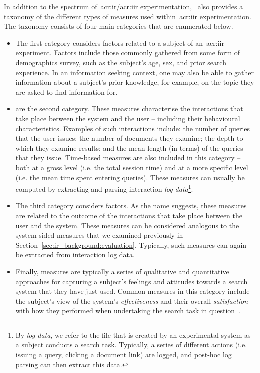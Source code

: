 In addition to the spectrum of~\gls{acr:ir}/\gls{acr:iir} experimentation,~\cite{kelly2009iir} also provides a taxonomy of the different types of measures used within~\gls{acr:iir} experimentation. The taxonomy consists of four main categories that are enumerated below.

\begin{itemize}
    
    \item{The first category considers  factors related to a subject of an~\gls{acr:iir} experiment. Factors include those commonly gathered from some form of demographics survey, such as the subject's age, sex, and prior search experience. In an information seeking context, one may also be able to gather information about a subject's prior knowledge, for example, on the topic they are asked to find information for.}
    
    \item{ are the second category. These measures characterise the interactions that take place between the system and the user -- including their behavioural characteristics. Examples of such interactions include: the number of queries that the user issues; the number of documents they examine; the depth to which they examine results; and the mean length (in terms) of the queries that they issue. Time-based measures are also included in this category -- both at a gross level (i.e. the total session time) and at a more specific level (i.e. the mean time spent entering queries). These measures can usually be computed by extracting and parsing interaction \emph{log data}\footnote{By \emph{log data}, we refer to the file that is created by an experimental system as a subject conducts a search task. Typically, a series of different actions (i.e. issuing a query, clicking a document link) are logged, and post-hoc log parsing can then extract this data.}.}
    
    \item{The third category considers  factors. As the name suggests, these measures are related to the outcome of the interactions that take place between the user and the system. These measures can be considered analogous to the system-sided measures that we examined previously in Section~\ref{sec:ir_background:evaluation}. Typically, such measures can again be extracted from interaction log data.}
    
    \item{Finally,  measures are typically a series of qualitative and quantitative approaches for capturing a subject's feelings and attitudes towards a search system that they have just used. Common measures in this category include the subject's view of the system's \emph{effectiveness} and their overall \emph{satisfaction} with how they performed when undertaking the search task in question~\citep{hornbaek2006usability}.}
    
\end{itemize}

